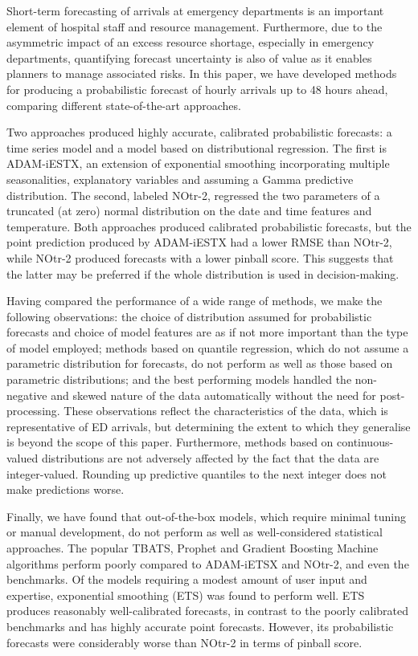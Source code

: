 \documentclass[]{elsarticle} %
\begin{document}
Short-term forecasting of arrivals at emergency departments is an important element of hospital staff and resource management. Furthermore, due to the asymmetric impact of an excess resource shortage, especially in emergency departments, quantifying forecast uncertainty is also of value as it enables planners to manage associated risks. In this paper, we have developed methods for producing a probabilistic forecast of hourly arrivals up to 48 hours ahead, comparing different state-of-the-art approaches.

Two approaches produced highly accurate, calibrated probabilistic forecasts: a time series model and a model based on distributional regression. The first is ADAM-iESTX, an extension of exponential smoothing incorporating multiple seasonalities, explanatory variables and assuming a Gamma predictive distribution. The second, labeled NOtr-2, regressed the two parameters of a truncated (at zero) normal distribution on the date and time features and temperature. Both approaches produced calibrated probabilistic forecasts, but the point prediction produced by ADAM-iESTX had a lower RMSE than NOtr-2, while NOtr-2 produced forecasts with a lower pinball score. This suggests that the latter may be preferred if the whole distribution is used in decision-making.

Having compared the performance of a wide range of methods, we make the following observations: the choice of distribution assumed for probabilistic forecasts and choice of model features are as if not more important than the type of model employed; methods based on quantile regression, which do not assume a parametric distribution for forecasts, do not perform as well as those based on parametric distributions; and the best performing models handled the non-negative and skewed nature of the data automatically without the need for post-processing. These observations reflect the characteristics of the data, which is representative of ED arrivals, but determining the extent to which they generalise is beyond the scope of this paper. Furthermore, methods based on continuous-valued distributions are not adversely affected by the fact that the data are integer-valued. Rounding up predictive quantiles to the next integer does not make predictions worse.

Finally, we have found that out-of-the-box models, which require minimal tuning or manual development, do not perform as well as well-considered statistical approaches. The popular TBATS, Prophet and Gradient Boosting Machine algorithms perform poorly compared to ADAM-iETSX and NOtr-2, and even the benchmarks. Of the models requiring a modest amount of user input and expertise, exponential smoothing (ETS) was found to perform well. ETS produces reasonably well-calibrated forecasts, in contrast to the poorly calibrated benchmarks and has highly accurate point forecasts. However, its probabilistic forecasts were considerably worse than NOtr-2 in terms of pinball score.
\end{document}

